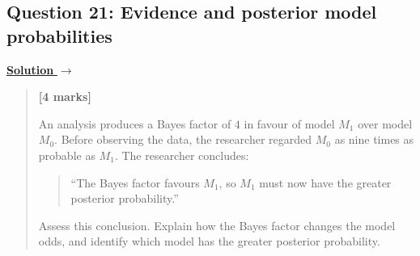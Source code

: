 \documentclass[11pt,a4paper]{article}
\newenvironment{examquestion}[2]
  {\subsection{#1}\label{question:\arabic{subsection}}\label{#2}%
   \noindent\hyperref[answer:\arabic{subsection}]{\textbf{Solution} $\rightarrow$}%
   \begin{quote}\color{statgrey}}
  {\end{quote}}
\begin{document}
\clearpage

\begin{examquestion}{Question 21: Evidence and posterior model probabilities}{question:practice-evidence-and-posterior-model-probabilities}
\textbf{[4 marks]}

An analysis produces a Bayes factor of $4$ in favour of model $M_1$ over
model $M_0$. Before observing the data, the researcher regarded $M_0$ as nine
times as probable as $M_1$. The researcher concludes:
\begin{quote}
``The Bayes factor favours $M_1$, so $M_1$ must now have the greater posterior
probability.''
\end{quote}
Assess this conclusion. Explain how the Bayes factor changes the model odds,
and identify which model has the greater posterior probability.
\end{examquestion}

\newpage
\end{document}
